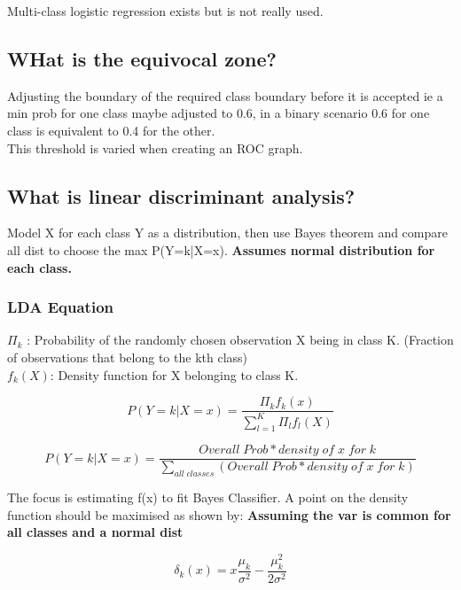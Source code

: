 \documentclass[11pt]{scrartcl} %
\begin{document}
Multi-class logistic regression exists but is not really used.

\subsection{WHat is the equivocal zone?}

Adjusting the boundary of the required class boundary before it is accepted ie a min prob for one class maybe adjusted to
0.6, in a binary scenario 0.6 for one class is equivalent to 0.4 for the other.\\

This threshold is varied when creating an ROC graph.

\subsection{What is linear discriminant analysis?}

Model X for each class Y as a distribution, then use Bayes theorem and compare all dist to choose the max P(Y=k|X=x).
\textbf{Assumes normal distribution for each class.}

\subsubsection{LDA Equation}

\(\Pi_k\) : Probability of the randomly chosen observation X being in class K. (Fraction of observations that belong to the kth class)\\

\(f_k(X)\): Density function for X belonging to class K.

\begin{equation}
	P(Y=k|X=x) = \frac{\Pi_kf_k(x)}{\sum^K_{l=1}{\Pi_lf_l(X)}}
\end{equation}

\begin{equation}
	P(Y=k|X=x) = \frac{Overall\; Prob * density\; of \; x \; for \; k}{\sum_{all\; classes}(Overall\; Prob * density\; of \; x \; for \; k)}
\end{equation}

The focus is estimating f(x) to fit Bayes Classifier. A point on the density function should be maximised as shown by:
\textbf{Assuming the var is common for all classes and a normal dist}

\begin{equation}
	\delta_k(x) = x\frac{\mu_k}{\sigma^2} - \frac{\mu_k^2}{2\sigma^2}
\end{equation}
\end{document}
